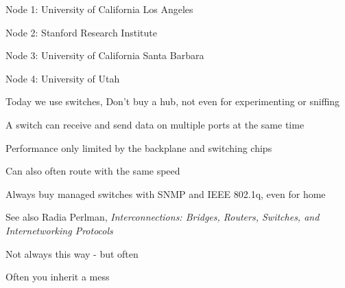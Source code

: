 \documentclass[Screen16to9,17pt]{foils}
\begin{document}

\begin{list2}
\item Node 1: University of California Los Angeles
\item Node 2: Stanford Research Institute
\item Node 3: University of California Santa Barbara
\item Node 4: University of Utah
\end{list2}





\begin{list1}
\item Today we use switches, Don't buy a hub, not even for experimenting or sniffing
\item A switch can receive and send data on multiple ports at the same time
\item Performance only limited by the backplane and switching chips
\item Can also often route with the same speed
\item Always buy managed switches with SNMP and IEEE 802.1q, even for home
\end{list1}




See also Radia Perlman, \emph{Interconnections: Bridges, Routers, Switches, and Internetworking Protocols}



\centerline{Not always this way - but often }



\centerline{Often you inherit a mess}





\end{document}
